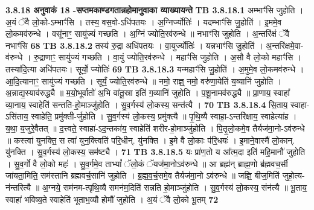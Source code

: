 \documentclass[17pt]{extarticle}
\begin{document}
{{{{{{{{{{{{{{{{{{{{{{                \textbf{ 3.8.18    अनुवाकं   18 -सप्तमकाण्डगतान्नहोमानुवाका व्याख्यायन्ते} \newline
                                \textbf{ TB 3.8.18.1} \newline
                  अम्भाꣳ॑सि जुहोति । अ॒यं ॅवै लो॒को-ऽम्भाꣳ॑सि । तस्य॒ वस॒वो-ऽधि॑पतयः । अ॒ग्निर्ज्योतिः॑ । यदम्भाꣳ॑सि जु॒होति॑ । इ॒ममे॒व लो॒कमव॑रुन्धे । वसू॑नाꣳ॒॒ सायु॑ज्यं गच्छति । अ॒ग्निं ज्योति॒रव॑रुन्धे ॥ नभाꣳ॑सि जुहोति । अ॒न्तरि॑क्षं ॅवै नभाꣳ॑सि \textbf{ 68} \newline
                  \newline
                                \textbf{ TB 3.8.18.2} \newline
                  तस्य॑ रु॒द्रा अधि॑पतयः । वा॒युर्ज्योतिः॑ । यन्नभाꣳ॑सि जु॒होति॑ । अ॒न्तरि॑क्षमे॒वा-व॑रुन्धे । रु॒द्राणाꣳ॒॒ सायु॑ज्यं गच्छति । वा॒युं ज्योति॒रव॑रुन्धे । महाꣳ॑सि जुहोति । अ॒सौ वै लो॒को महाꣳ॑सि । तस्या॑दि॒त्या अधि॑पतयः। सूर्यो॒ ज्योतिः॑ \textbf{ 69} \newline
                  \newline
                                \textbf{ TB 3.8.18.3} \newline
                  यन्महाꣳ॑सि जु॒होति॑ । अ॒मुमे॒व लो॒कमव॑रुन्धे । आ॒दि॒त्यानाꣳ॒॒ सायु॑ज्यं गच्छति । सूर्यं॒ ज्योति॒रव॑रुन्धे ॥ नमो॒ राज्ञ्॒ नमो॒ वरु॑णा॒येति॑ य॒व्यानि॑ जुहोति । अ॒न्नाद्य॒स्याव॑रुद्ध्यै ॥ म॒यो॒भूर्वातो॑ अ॒भि वा॑तू॒स्रा इति॑ ग॒व्यानि॑ जुहोति । प॒शू॒नामव॑रुद्ध्यै ॥ प्रा॒णाय॒ स्वाहा᳚ व्या॒नाय॒ स्वाहेति॑ सन्तति-हो॒माञ्जु॑होति । सु॒व॒र्गस्य॑ लो॒कस्य॒ सन्त॑त्यै । \textbf{ 70} \newline
                  \newline
                                \textbf{ TB 3.8.18.4} \newline
                  सि॒ताय॒ स्वाहा-ऽसि॑ताय॒ स्वाहेति॒ प्रमु॑क्ती-र्जुहोति । सु॒व॒र्गस्य॑ लो॒कस्य॒ प्रमु॑क्त्यै ॥ पृ॒थि॒व्यै स्वाहा॒-ऽन्तरि॑क्षाय॒ स्वाहेत्या॑ह । य॒था॒ य॒जुरे॒वैतत् ॥ द॒त्त्वते॒ स्वाहा॑-ऽद॒न्तका॑य॒ स्वाहेति॑ शरीर-हो॒माञ्जु॑होति । पि॒तृ॒लो॒कमे॒व तैर्यज॑मा॒नो-ऽव॑रुन्धे ॥ कस्त्वा॑ युनक्ति॒ स त्वा॑ युन॒क्त्विति॑ परि॒धीन्. यु॑नक्ति । इ॒मे वै लो॒काः प॑रि॒धयः॑ । इ॒माने॒वास्मै॑ लो॒कान्. यु॑नक्ति । सु॒व॒र्गस्य॑ लो॒कस्य॒ सम॑ष्ट्यै । \textbf{ 71} \newline
                  \newline
                                \textbf{ TB 3.8.18.5} \newline
                  यः प्रा॑ण॒तो य आ᳚त्म॒दा इति॑ महि॒मानौ॑ जुहोति । सु॒व॒र्गो वै लो॒को महः॑ । सु॒व॒र्गमे॒व ताभ्यां᳚ ॅलो॒कं ॅयज॑मा॒नोऽव॑रुन्धे ॥ आ ब्रह्म॑न् ब्राह्म॒णो ब्र॑ह्मवच॒र्सी जा॑यता॒मिति॒ सम॑स्तानि ब्रह्मवर्च॒सानि॑ जुहोति । ब्र॒ह्म॒व॒र्च॒समे॒व तैर्यज॑मा॒नो ऽव॑रुन्धे ॥ जज्ञि॒ बीज॒मिति॑ जुहो॒त्य-न॑न्तरित्यै ॥ अ॒ग्नये॒ सम॑नम-त्पृथि॒व्यै समन॑म॒दिति॑ सन्नति हो॒माञ्जु॑होति । सु॒व॒र्गस्य॑ लो॒कस्य॒ संन॑त्यै ॥ भू॒ताय॒ स्वाहा॑ भविष्य॒ते स्वाहेति॑ भूताभ॒व्यौ होमौ॑ जुहोति । अ॒यं ॅवै लो॒को भू॒तम् \textbf{ 72} \newline
}}}}}}}}}}}}}}}}}}}}}}
\end{document}
